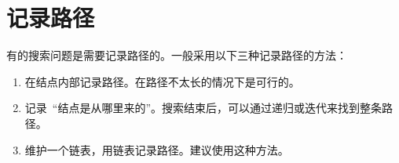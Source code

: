 \section{记录路径}
	有的搜索问题是需要记录路径的。一般采用以下三种记录路径的方法：
	
	\begin{enumerate}
		\item 在结点内部记录路径。在路径不太长的情况下是可行的。
		\item 记录~``结点是从哪里来的''。搜索结束后，可以通过递归或迭代来找到整条路径。
		\item 维护一个链表，用链表记录路径。建议使用这种方法。
	\end{enumerate}